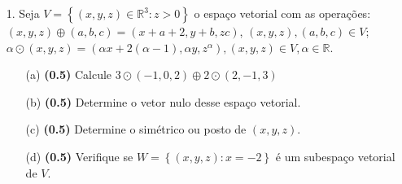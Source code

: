 \documentclass[oneside,a4paper,11pt]{article}
\begin{document}
	\vspace{10pt}
\begin{itemize}
	
	\item[1.] Seja $V=\left\lbrace (x,y,z)\in \mathbb{R}^{3}: z>0 \right\rbrace $ o espaço vetorial com as operações:
	$(x,y,z)\oplus(a,b,c)=(x+a+2,y+b,zc)$, $(x,y,z), (a,b,c)\in V$;
	$\alpha\odot(x,y,z)=(\alpha x+2(\alpha-1), \alpha y, z^{\alpha}), (x,y,z)\in V, \alpha \in \mathbb{R}$.
	\begin{itemize}
	\item[(a)]\textbf{(0.5)} Calcule $3\odot(-1,0,2)\oplus 2\odot(2,-1,3)$
	\item[(b)]\textbf{(0.5)} Determine o vetor nulo desse espaço vetorial.
	\item[(c)]\textbf{(0.5)} Determine o simétrico ou posto de $(x,y,z)$.
	\item[(d)]\textbf{(0.5)} Verifique se $W=\left\lbrace (x,y,z): x=-2\right\rbrace$ é um subespaço vetorial de $V$.
	\end{itemize}
\end{itemize}
\end{document}

